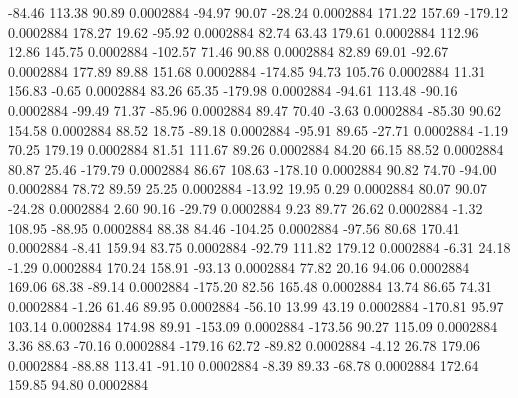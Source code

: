       -84.46      113.38       90.89     0.0002884
      -94.97       90.07      -28.24     0.0002884
      171.22      157.69     -179.12     0.0002884
      178.27       19.62      -95.92     0.0002884
       82.74       63.43      179.61     0.0002884
      112.96       12.86      145.75     0.0002884
     -102.57       71.46       90.88     0.0002884
       82.89       69.01      -92.67     0.0002884
      177.89       89.88      151.68     0.0002884
     -174.85       94.73      105.76     0.0002884
       11.31      156.83       -0.65     0.0002884
       83.26       65.35     -179.98     0.0002884
      -94.61      113.48      -90.16     0.0002884
      -99.49       71.37      -85.96     0.0002884
       89.47       70.40       -3.63     0.0002884
      -85.30       90.62      154.58     0.0002884
       88.52       18.75      -89.18     0.0002884
      -95.91       89.65      -27.71     0.0002884
       -1.19       70.25      179.19     0.0002884
       81.51      111.67       89.26     0.0002884
       84.20       66.15       88.52     0.0002884
       80.87       25.46     -179.79     0.0002884
       86.67      108.63     -178.10     0.0002884
       90.82       74.70      -94.00     0.0002884
       78.72       89.59       25.25     0.0002884
      -13.92       19.95        0.29     0.0002884
       80.07       90.07      -24.28     0.0002884
        2.60       90.16      -29.79     0.0002884
        9.23       89.77       26.62     0.0002884
       -1.32      108.95      -88.95     0.0002884
       88.38       84.46     -104.25     0.0002884
      -97.56       80.68      170.41     0.0002884
       -8.41      159.94       83.75     0.0002884
      -92.79      111.82      179.12     0.0002884
       -6.31       24.18       -1.29     0.0002884
      170.24      158.91      -93.13     0.0002884
       77.82       20.16       94.06     0.0002884
      169.06       68.38      -89.14     0.0002884
     -175.20       82.56      165.48     0.0002884
       13.74       86.65       74.31     0.0002884
       -1.26       61.46       89.95     0.0002884
      -56.10       13.99       43.19     0.0002884
     -170.81       95.97      103.14     0.0002884
      174.98       89.91     -153.09     0.0002884
     -173.56       90.27      115.09     0.0002884
        3.36       88.63      -70.16     0.0002884
     -179.16       62.72      -89.82     0.0002884
       -4.12       26.78      179.06     0.0002884
      -88.88      113.41      -91.10     0.0002884
       -8.39       89.33      -68.78     0.0002884
      172.64      159.85       94.80     0.0002884
